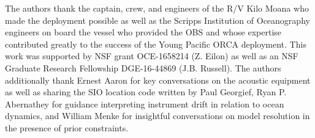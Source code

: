The authors thank the captain, crew, and engineers of the R/V Kilo Moana who made the deployment possible as well as the Scripps Institution of Oceanography engineers on board the vessel who provided the OBS and whose expertise contributed greatly to the success of the Young Pacific ORCA deployment. This work was supported by NSF grant OCE-1658214 (Z. Eilon) as well as an NSF Graduate Research Fellowship DGE-16-44869 (J.B. Russell). The authors additionally thank Ernest Aaron for key conversations on the acoustic equipment as well as sharing the SIO location code written by Paul Georgief, Ryan P. Abernathey for guidance interpreting instrument drift in relation to ocean dynamics, and William Menke for insightful conversations on model resolution in the presence of prior constraints.